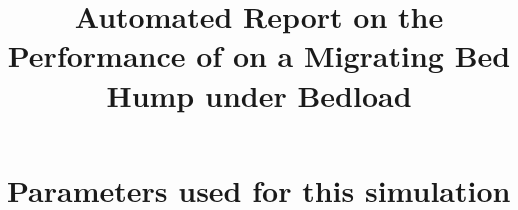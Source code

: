 \documentclass[11pt,a4paper]{article}%
\begin{document}
 

\title{Automated Report on the Performance of \anuga{} on a Migrating Bed Hump under Bedload}
\maketitle




\section{Parameters used for this simulation}






\end{document}
